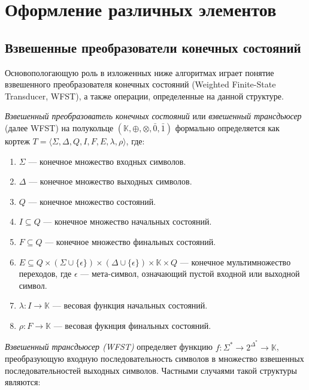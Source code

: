\chapter{Оформление различных элементов}\label{ch:ch1}


\section{Взвешенные преобразователи конечных состояний}\label{sec:ch1/wfst}

Основопологающую роль в изложенных ниже алгоритмах играет понятие взвешенного преобразователя конечных состояний (Weighted Finite-State Transducer, WFST), а также операции, определенные на данной структуре.

\textit{Взвешенный преобразователь конечных состояний} или \textit{взвешенный трансдьюсер} (далее WFST) на полукольце $(\mathbb{K}, \oplus, \otimes, \bar{0}, \bar{1})$ формально определяется как кортеж $T = \langle\Sigma,\Delta,Q,I,F,E,\lambda,\rho\rangle$, где:
\begin{enumerate}
  \item $\Sigma$ --- конечное множество входных символов.
  \item $\Delta$ --- конечное множество выходных символов.
  \item $Q$ --- конечное множество состояний.
  \item $I \subseteq Q$ --- конечное множество начальных состояний.
  \item $F \subseteq Q$ --- конечное множество финальных состояний.
  \item $E \subseteq Q \times (\Sigma \cup \{\epsilon\}) \times (\Delta \cup \{\epsilon\}) \times \mathbb{K} \times Q$ --- конечное мультимножество переходов, где $\epsilon$ --- мета-символ, означающий пустой входной или выходной символ.
  \item $\lambda : I \rightarrow \mathbb{K}$ --- весовая функция начальных состояний.
  \item $\rho : F \rightarrow \mathbb{K}$ --- весовая фукнция финальных состояний.
\end{enumerate}

\textit{Взвешенный трансдьюсер (WFST)} определяет функцию $f : \Sigma^* \rightarrow 2^{\Delta^*} \rightarrow \mathbb{K}$, преобразующую входную последовательность символов в множество взвешенных последовательностей выходных символов. Частными случаями такой структуры являются:

